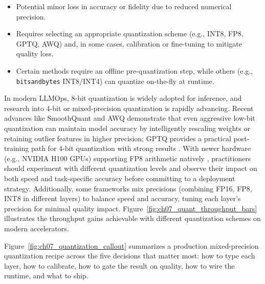 \begin{tcolorbox}[
  title={\textbf{Quantization: Cons}},
  colback=red!5,
  colframe=red!40!black,
  colbacktitle=red!20,
  coltitle=black,
  fonttitle=\bfseries,
  boxrule=0.7pt,
  arc=4pt,
  left=5mm, right=5mm, top=4mm, bottom=4mm,
  before skip=6pt,
  after skip=6pt
]
\begin{itemize}[leftmargin=1.5em, itemsep=3pt]
    \item Potential minor loss in accuracy or fidelity due to reduced numerical precision.
    \item Requires selecting an appropriate quantization scheme (e.g., INT8, FP8, GPTQ, AWQ) and, in some cases, calibration or fine-tuning to mitigate quality loss.
    \item Certain methods require an offline pre-quantization step, while others (e.g., \texttt{bitsandbytes} INT8/INT4) can quantize on-the-fly at runtime.
\end{itemize}
\end{tcolorbox}

In modern LLMOps, 8-bit quantization is widely adopted for inference, and research into 4-bit or mixed-precision quantization is rapidly advancing. Recent advances like SmoothQuant \cite{Xiao2023SmoothQuant} and AWQ \cite{Lin2023AWQ} demonstrate that even aggressive low-bit quantization can maintain model accuracy by intelligently rescaling weights or retaining outlier features in higher precision; GPTQ provides a practical post-training path for 4-bit quantization with strong results \cite{Frantar2023GPTQ}. With newer hardware (e.g., NVIDIA H100 GPUs) supporting FP8 arithmetic natively \cite{NVIDIA2023Hopper}, practitioners should experiment with different quantization levels and observe their impact on both speed and task-specific accuracy before committing to a deployment strategy. Additionally, some frameworks mix precisions (combining FP16, FP8, INT8 in different layers) to balance speed and accuracy, tuning each layer's precision for minimal quality impact. Figure~\ref{fig:ch07_quant_throughput_bars} illustrates the throughput gains achievable with different quantization schemes on modern accelerators.

Figure~\ref{fig:ch07_quantization_callout} summarizes a production mixed-precision quantization recipe across the five decisions that matter most: how to type each layer, how to calibrate, how to gate the result on quality, how to wire the runtime, and what to ship.

